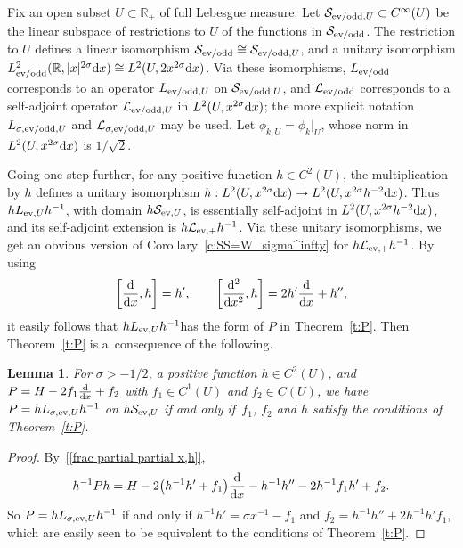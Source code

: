 \documentclass[pdftex]{sigma}
\newtheorem{Lemma}[Theorem]{Lemma}
\newcommand{\R}{\mathbb{R}}
\newcommand{\LL}{\mathcal{L}}
\renewcommand{\SS}{\mathcal{S}}
\newcommand{\Cinf}{C^\infty}
\begin{document}
Fix an open subset $U\subset\R_+$ of full Lebesgue measure. Let $\SS_{\text{\rm ev/odd},U}\subset\Cinf(U)$ be the linear subspace of restrictions to $U$ of the functions in $\SS_{\text{\rm ev/odd}}$. The restriction to $U$ def\/ines a linear isomorphism $\SS_{\text{\rm ev/odd}}\cong\SS_{\text{\rm ev/odd},U}$, and a unitary isomorphism $L^2_{\text{\rm ev/odd}}(\R,|x|^{2\sigma}{\rm d}x)\cong L^2(U,2x^{2\sigma}{\rm d}x)$. Via these isomorphisms, $L_{\text{\rm ev/odd}}$ corresponds to an operator $L_{\text{\rm ev/odd},U}$ on $\SS_{\text{\rm ev/odd},U}$, and $\LL_{\text{\rm ev/odd}}$ corresponds to a self-adjoint operator $\LL_{\text{\rm ev/odd},U}$ in $L^2(U,x^{2\sigma}{\rm d}x)$; the more explicit notation $L_{\sigma,\text{\rm ev/odd},U}$ and $\LL_{\sigma,\text{\rm ev/odd},U}$ may be used. Let $\phi_{k,U}=\phi_k|_U$, whose norm in $L^2(U,x^{2\sigma}{\rm d}x)$ is $1/\sqrt{2}$.

Going one step further, for any positive function $h\in C^2(U)$, the multiplication by $h$ def\/ines a unitary isomorphism $h:L^2(U,x^{2\sigma}{\rm d}x)\to L^2(U,x^{2\sigma}h^{-2}{\rm d}x)$. Thus $hL_{\text{\rm ev},U}h^{-1}$, with domain $h \SS_{\text{\rm ev},U}$, is essentially self-adjoint in $L^2(U,x^{2\sigma}h^{-2}{\rm d}x)$, and its self-adjoint extension is $h\LL_{\text{\rm ev},+}h^{-1}$. Via these unitary isomorphisms, we get an obvious version of Corollary~\ref{c:SS=W_sigma^infty} for $h\LL_{\text{\rm ev},+}h^{-1}$. By using
  \begin{gather}\label{[frac partial partial x,h]}
    \left[\frac{{\rm d}}{{\rm d}x},h\right]=h' ,\qquad
    \left[\frac{{\rm d}^2}{{\rm d}x^2},h\right]=2h'\frac{{\rm d}}{{\rm d}x}+h'' ,
  \end{gather}
it easily follows that $hL_{\text{\rm ev},U}h^{-1}$has the form of $P$ in Theorem~\ref{t:P}. Then Theorem~\ref{t:P} is a~consequence of the following.

\begin{Lemma}\label{l:P}
  For $\sigma>-1/2$, a positive function $h\in C^2(U)$, and $P=H-2f_1 \frac{{\rm d}}{{\rm d}x}+f_2$ with $f_1\in C^1(U)$ and $f_2\in C(U)$, we have $P=hL_{\sigma,\text{\rm ev},U}h^{-1}$ on $h \SS_{\text{\rm ev},U}$ if and only if~$f_1$, $f_2$ and $h$ satisfy the conditions of Theorem~{\rm \ref{t:P}}.
\end{Lemma}

\begin{proof}
  By~\eqref{[frac partial partial x,h]},
    \[
      h^{-1}Ph=H-2\big(h^{-1}h'+f_1\big)\frac{{\rm d}}{{\rm d}x}-h^{-1}h''-2h^{-1}f_1h'+f_2 .
    \]
  So $P=hL_{\sigma,\text{\rm ev},U}h^{-1}$ if and only if $h^{-1}h'=\sigma x^{-1}-f_1$ and $f_2=h^{-1}h''+2h^{-1}h'f_1$, which are easily seen to be equivalent to the conditions of Theorem~\ref{t:P}.
\end{proof}
\end{document}
